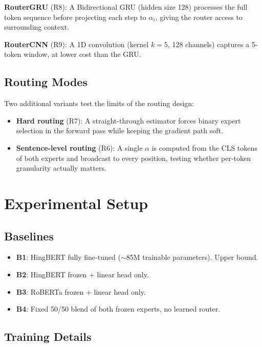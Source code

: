 \documentclass[conference]{IEEEtran}
\begin{document}
\textbf{RouterGRU} (R8): A Bidirectional GRU (hidden size 128) processes the full token sequence before projecting each step to $\alpha_i$, giving the router access to surrounding context.

\textbf{RouterCNN} (R9): A 1D convolution (kernel $k{=}5$, 128 channels) captures a 5-token window, at lower cost than the GRU.

\subsection{Routing Modes}

Two additional variants test the limits of the routing design:
\begin{itemize}
  \item \textbf{Hard routing} (R7): A straight-through estimator \cite{bengio2013ste} forces binary expert selection in the forward pass while keeping the gradient path soft.
  \item \textbf{Sentence-level routing} (R6): A single $\alpha$ is computed from the CLS tokens of both experts and broadcast to every position, testing whether per-token granularity actually matters.
\end{itemize}

\section{Experimental Setup}

\subsection{Baselines}

\begin{itemize}
  \item \textbf{B1}: HingBERT fully fine-tuned ($\sim$85M trainable parameters). Upper bound.
  \item \textbf{B2}: HingBERT frozen + linear head only.
  \item \textbf{B3}: RoBERTa frozen + linear head only.
  \item \textbf{B4}: Fixed 50/50 blend of both frozen experts, no learned router.
\end{itemize}

\subsection{Training Details}
\end{document}
